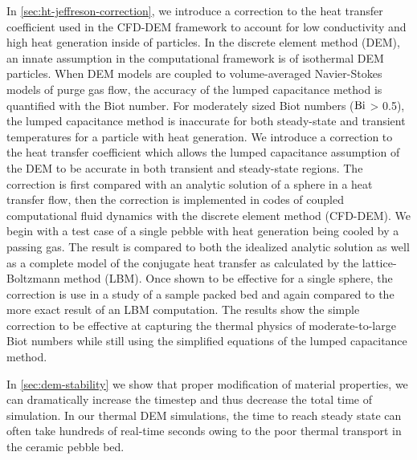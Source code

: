 In \cref{sec:ht-jeffreson-correction}, we introduce a correction to the heat transfer coefficient used in the CFD-DEM framework to account for low conductivity and high heat generation inside of particles. In the discrete element method (DEM), an innate assumption in the computational framework is of isothermal DEM particles. When DEM models are coupled to volume-averaged Navier-Stokes models of purge gas flow, the accuracy of the lumped capacitance method is quantified with the Biot number. For moderately sized Biot numbers ($\mathrm{Bi}$ > 0.5), the lumped capacitance method is inaccurate for both steady-state and transient temperatures for a particle with heat generation. We introduce a correction to the heat transfer coefficient which allows the lumped capacitance assumption of the DEM to be accurate in both transient and steady-state regions. The correction is first compared with an analytic solution of a sphere in a heat transfer flow, then the correction is implemented in codes of coupled computational fluid dynamics with the discrete element method (CFD-DEM). We begin with a test case of a single pebble with heat generation being cooled by a passing gas. The result is compared to both the idealized analytic solution as well as a complete model of the conjugate heat transfer as calculated by the lattice-Boltzmann method (LBM). Once shown to be effective for a single sphere, the correction is use in a study of a sample packed bed and again compared to the more exact result of an LBM computation. The results show the simple correction to be effective at capturing the thermal physics of moderate-to-large Biot numbers while still using the simplified equations of the lumped capacitance method.

In \cref{sec:dem-stability} we show that proper modification of material properties, we can dramatically increase the timestep and thus decrease the total time of simulation. In our thermal DEM simulations, the time to reach steady state can often take hundreds of real-time seconds owing to the poor thermal transport in the ceramic pebble bed. 